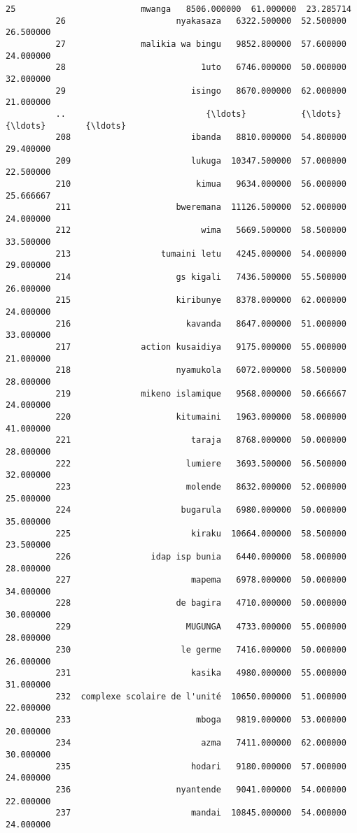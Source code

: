 \documentclass[11pt]{article}
\begin{document}
\begin{Verbatim}[commandchars=\\\{\}]
          25                         mwanga   8506.000000  61.000000  23.285714   
          26                      nyakasaza   6322.500000  52.500000  26.500000   
          27               malikia wa bingu   9852.800000  57.600000  24.000000   
          28                           1uto   6746.000000  50.000000  32.000000   
          29                         isingo   8670.000000  62.000000  21.000000   
          ..                            {\ldots}           {\ldots}        {\ldots}        {\ldots}   
          208                        ibanda   8810.000000  54.800000  29.400000   
          209                        lukuga  10347.500000  57.000000  22.500000   
          210                         kimua   9634.000000  56.000000  25.666667   
          211                     bweremana  11126.500000  52.000000  24.000000   
          212                          wima   5669.500000  58.500000  33.500000   
          213                  tumaini letu   4245.000000  54.000000  29.000000   
          214                     gs kigali   7436.500000  55.500000  26.000000   
          215                     kiribunye   8378.000000  62.000000  24.000000   
          216                       kavanda   8647.000000  51.000000  33.000000   
          217              action kusaidiya   9175.000000  55.000000  21.000000   
          218                     nyamukola   6072.000000  58.500000  28.000000   
          219              mikeno islamique   9568.000000  50.666667  24.000000   
          220                     kitumaini   1963.000000  58.000000  41.000000   
          221                        taraja   8768.000000  50.000000  28.000000   
          222                       lumiere   3693.500000  56.500000  32.000000   
          223                       molende   8632.000000  52.000000  25.000000   
          224                      bugarula   6980.000000  50.000000  35.000000   
          225                        kiraku  10664.000000  58.500000  23.500000   
          226                idap isp bunia   6440.000000  58.000000  28.000000   
          227                        mapema   6978.000000  50.000000  34.000000   
          228                     de bagira   4710.000000  50.000000  30.000000   
          229                       MUGUNGA   4733.000000  55.000000  28.000000   
          230                      le germe   7416.000000  50.000000  26.000000   
          231                        kasika   4980.000000  55.000000  31.000000   
          232  complexe scolaire de l'unité  10650.000000  51.000000  22.000000   
          233                         mboga   9819.000000  53.000000  20.000000   
          234                          azma   7411.000000  62.000000  30.000000   
          235                        hodari   9180.000000  57.000000  24.000000   
          236                     nyantende   9041.000000  54.000000  22.000000   
          237                        mandai  10845.000000  54.000000  24.000000   
          

\end{Verbatim}
\end{document}
